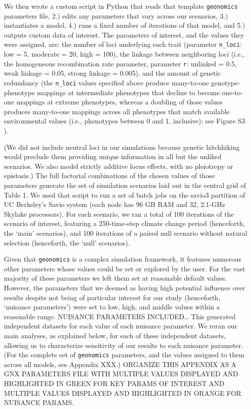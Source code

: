 \documentclass[9pt,twocolumn,twoside,lineno]{pnas-new}
\begin{document}
{We then wrote a custom script in Python that reads that template \texttt{geonomics}
parameters file, 2.) edits any parameters that vary 
across our scenarios, 3.) instantiates a model, 4.) runs a fixed number of iterations 
of that model, and 5.) outputs custom data of interest. The parameters of interest, 
and the values they were assigned, are: the number of loci underlying each trait 
(parameter \texttt{n\_loci}: low = 5, moderate = 20, high = 100), the linkage between 
neighboring loci (i.e., the homogeneous recombination rate parameter, parameter \texttt{r}: unlinked = 
0.5, weak linkage = 0.05, strong linkage = 0.005), and the amount of genetic redundancy
(the \texttt{n\_loci} values specified above produce many-to-one genotype-phenotype mappings
at intermediate phenotypes that decline to become one-to-one mappings at extreme phenotypes,
whereas a doubling of those values produces many-to-one mappings across
all phenotypes that match available environmental values (i.e., phenotypes between 0 and 1, inclusive); see Figure S3 ).

(We did not include neutral loci in our simulations because genetic
hitchhiking would preclude them providing unique information
in all but the unliked scenarios. We also model strictly additive locus effects,
with no pleiotropy or epistasis.)
The full factorial combinations
of the chosen values of those parameters generate the set
of simulation scenarios laid out in
the central grid of Table 1. We used that script to run a set of batch jobs on the 
savio3 partition of UC Berkeley’s Savio system (each node has 96 GB RAM and 32, 
2.1-GHz Skylake processors). For each scenario, we ran a total of 100 iterations of 
the scenario of interest, featuring a 250-time-step climate change period (henceforth, 
the ‘main’ scenarios), and 100 iterations of a paired null scenario without natural 
selection (henceforth, the ‘null’ scenarios). 


Given that \texttt{geonomics} is a complex simulation framework, it features numerous other 
parameters whose values could be set or explored by the user. For the vast majority of
these parameters we left them set at reasonable default values. However, the 
parameters that we deemed as having high potential influence over results despite not 
being of particular interest for our study (henceforth, ‘nuisance parameters’) were 
set to low, high, and middle values within a reasonable range. NUISANCE PARAMETERS 
INCLUDED… This generated independent datasets for each value of each nuisance 
parameter. We reran our main analyses, as explained below, for each of these 
independent datasets, allowing us to characterize sensitivity of our results to each 
nuisance parameter. (For the complete set of \texttt{geonomics} parameters, and the values 
assigned to them across all models, see Appendix XXX.) ORGANIZE THIS APPENDIX AS A GNX
PARAMETERS FILE WITH MULTIPLE VALUES DISPLAYED AND HIGHLIGHTED IN GREEN FOR KEY PARAMS
OF INTEREST AND MULTIPLE VALUES DISPLAYED AND HIGHLIGHTED IN ORANGE FOR NUISANCE PARAMS.


}
\end{document}
